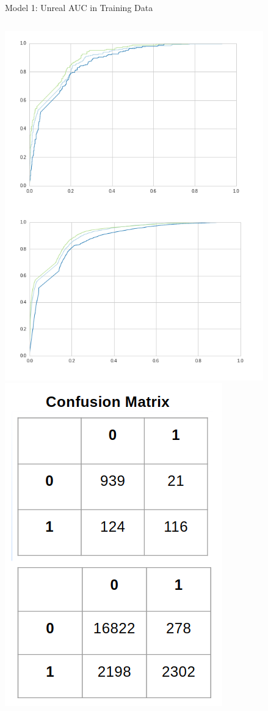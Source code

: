 \documentclass{beamer}
\begin{document}
\begin{frame}{Model 1: Unreal AUC in Training Data}

  \begin{columns}
    \includegraphics[scale=0.25]{img/roccurve.png}
    \includegraphics[scale=0.25]{img/confmatrix.png}

\end{columns}
\end{frame}
\end{document}
